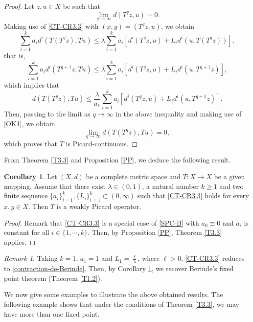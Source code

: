 \documentclass[letterpaper,12pt]{article}
\numberwithin{equation}{section}
\theoremstyle{definition}
\newtheorem{corollary}[theorem]{Corollary}
\theoremstyle{remark}
\newtheorem{remark}[theorem]{Remark}
\begin{document}
\begin{proof}
Let $z,u\in X$ be such that 
\begin{equation}\label{OK1}
\lim_{q\to \infty}  d(T^{q}z,u)=0.	
\end{equation}
Making use of \eqref{CT-CR3.3} with $(x,y)=(T^{q}z,u)$, we obtain
$$
\sum_{i=1}^ka_id^i(T(T^{q}z),Tu)\leq \lambda \sum_{i=1}^k a_i\left[d^i(T^{q}z,u)+L_id^i(u,T(T^{q}z))\right],
$$
that is,
$$
\sum_{i=1}^ka_id^i(T^{q+1}z,Tu)\leq \lambda \sum_{i=1}^k a_i\left[d^i(T^{q}z,u)+L_id^i(u,T^{q+1}z)\right], 
$$
which implies that 
$$
d(T(T^{q}z),Tu)\leq \frac{\lambda}{a_1} \sum_{i=1}^k a_i\left[d^i(T^{q}z,u)+L_id^i(u,T^{q+1}z)\right].
$$
Then, passing to the limit as $q\to \infty$ in the above inequality and making use of \eqref{OK1}, we obtain
$$
\lim_{q\to \infty}  d(T(T^{q}z),Tu)=0,	
$$
which proves that $T$ is Picard-continuous. 	
\end{proof}

From Theorem \ref{T3.3} and Proposition \ref{PP}, we deduce the following result. 

\begin{corollary}\label{CR3.4}
Let $(X,d)$ be a complete metric space and $T: X\to X$ be a given mapping. Assume that there exist $\lambda\in (0,1)$, a natural number $k\geq 1$ and two finite sequence $\{a_i\}_{i=1}^k, \{L_i\}_{i=1}^k\subset (0,\infty)$ such that \eqref{CT-CR3.3} holds for every $x,y\in X$. Then $T$ is a weakly Picard operator. 
\end{corollary}

\begin{proof}
Remark that \eqref{CT-CR3.3} is a special case of \eqref{SPC-B} with $a_0\equiv 0$ and $a_i$ is constant for all $i\in\{1,\cdots,k\}$. Then, by 	Proposition \ref{PP}, Theorem \ref{T3.3} applies. 
\end{proof}

\begin{remark}
Taking $k=1$, $a_1=1$ and $L_1=\frac{\ell}{\lambda}$, where $\ell>0$, \eqref{CT-CR3.3}	reduces to	\eqref{contraction-de-Berinde}. Then, by Corollary \ref{CR3.4}, we recover Berinde's fixed point theorem (Theorem \ref{T1.2}). 
\end{remark}

We now give some examples to illustrate the above obtained results. The following example shows that under the conditions of Theorem \ref{T3.3}, we may have more than one fixed point. 
\end{document}
